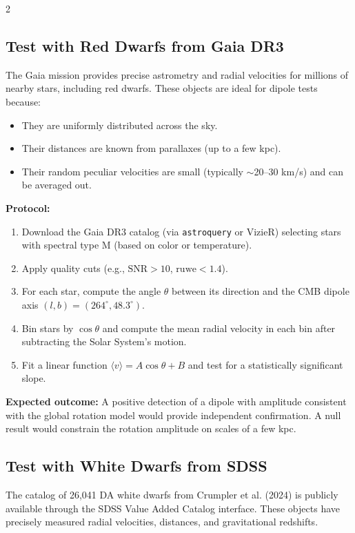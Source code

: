 \documentclass[12pt,a4paper]{article}
\begin{document}
\begin{multicols}{2}
		\subsection{Test with Red Dwarfs from Gaia DR3}
		
		The Gaia mission provides precise astrometry and radial velocities for millions of nearby stars, including red dwarfs. These objects are ideal for dipole tests because:
		\begin{itemize}
			\item They are uniformly distributed across the sky.
			\item Their distances are known from parallaxes (up to a few kpc).
			\item Their random peculiar velocities are small (typically \(\sim\)20--30 km/s) and can be averaged out.
		\end{itemize}
		
		\textbf{Protocol:}
		\begin{enumerate}
			\item Download the Gaia DR3 catalog (via \texttt{astroquery} or VizieR) selecting stars with spectral type M (based on color or temperature).
			\item Apply quality cuts (e.g., \(\mathrm{SNR} > 10\), \(\mathrm{ruwe} < 1.4\)).
			\item For each star, compute the angle \(\theta\) between its direction and the CMB dipole axis \((l,b) = (264^\circ, 48.3^\circ)\).
			\item Bin stars by \(\cos\theta\) and compute the mean radial velocity in each bin after subtracting the Solar System's motion.
			\item Fit a linear function \(\langle v \rangle = A \cos\theta + B\) and test for a statistically significant slope.
		\end{enumerate}
		
		\textbf{Expected outcome:} A positive detection of a dipole with amplitude consistent with the global rotation model would provide independent confirmation. A null result would constrain the rotation amplitude on scales of a few kpc.
		
		\subsection{Test with White Dwarfs from SDSS}
		
		The catalog of 26,041 DA white dwarfs from Crumpler et al. (2024) is publicly available through the SDSS Value Added Catalog interface. These objects have precisely measured radial velocities, distances, and gravitational redshifts.
		

\end{multicols}
\end{document}
